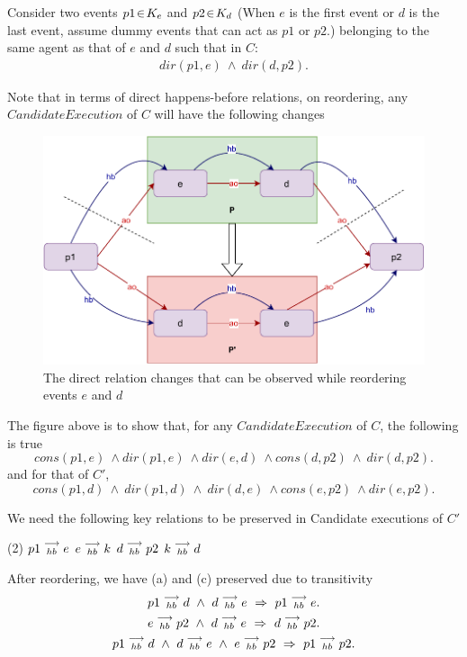     Consider two events $p1\!\in\!K_e$ and $p2\!\in\!K_d$ (When $e$ is the first event or $d$ is the last event, assume dummy events that can act as $p1$ or $p2$.) belonging to the same agent as that of $e$ and $d$ such that in $C$:
    \begin{align*}
        dir(p1,e)\ \wedge\ dir(d,p2).
    \end{align*}
    
    Note that in terms of direct happens-before relations, on reordering, any $Candidate Execution$ of $C$ will have the following changes
    \begin{figure}[H]
        \centering
        \includegraphics[scale=0.7]{5.InstructionReordering/4.ValidReorderingCandidate/ProofParts/Part1/part1(b).pdf}
        \caption{The direct relation changes that can be observed while reordering events $e$ and $d$}
        \label{fig:my_label}
    \end{figure}
    
    The figure above is to show that, for any $Candidate Execution$ of $C$, the following is true
    \[
        cons(p1,e) \ \wedge dir(p1,e) \ \wedge dir(e,d) \ \wedge cons(d,p2) \ \wedge \ dir(d,p2).
    \]
    and for that of $C'$,
    \[
        cons(p1,d) \ \wedge \ dir(p1,d) \ \wedge \ dir(d,e) \ \wedge cons(e,p2) \ \wedge dir(e,p2).
    \]
    
    We need the following key relations to be preserved in Candidate executions of $C'$ 
    \begin{tasks}(2)
        \task $p1\stackrel{\longrightarrow}{_{hb}}e$
        \task $e\stackrel{\longrightarrow}{_{hb}}k$
        \task $d\stackrel{\longrightarrow}{_{hb}}p2$
        \task $k\stackrel{\longrightarrow}{_{hb}}d$ 
    \end{tasks}

    After reordering, we have (a) and (c) preserved due to transitivity  
    \begin{gather*}
        \reln{p1}{hb}{d} \ \wedge \ \reln{d}{hb}{e} \ \Rightarrow \ \reln{p1}{hb}{e}. \\
        \reln{e}{hb}{p2} \ \wedge \ \reln{d}{hb}{e} \ \Rightarrow \ \reln{d}{hb}{p2}. \\
        \reln{p1}{hb}{d} \ \wedge \ \reln{d}{hb}{e} \ \wedge \ \reln{e}{hb}{p2} \ \Rightarrow \ \reln{p1}{hb}{p2}. 
    \end{gather*}

